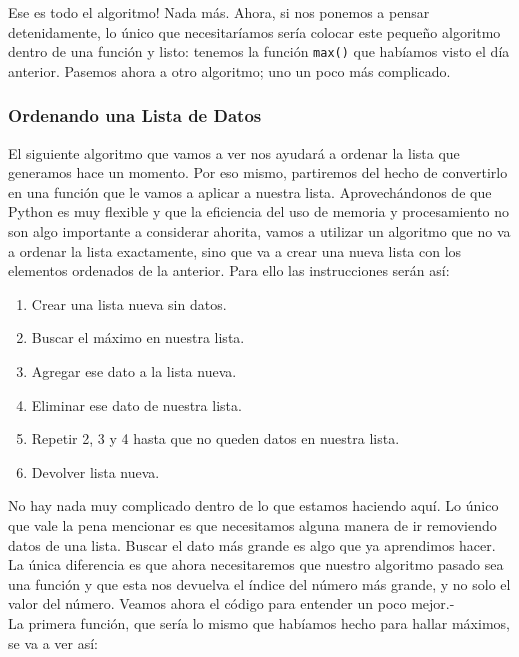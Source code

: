 \documentclass[10pt,letterpaper]{article}
\newcommand{\inlinecode}[1]{
\colorbox{light-gray}{\texttt{#1}}
}
\begin{document}
Ese es todo el algoritmo! Nada m\'as. Ahora, si nos ponemos a pensar detenidamente, lo \'unico que necesitar\'iamos ser\'ia colocar este peque\~no algoritmo dentro de una funci\'on y listo: tenemos la funci\'on \inlinecode{max()} que hab\'iamos visto el d\'ia anterior. Pasemos ahora a otro algoritmo; uno un poco m\'as complicado.

\subsubsection{Ordenando una Lista de Datos}
El siguiente algoritmo que vamos a ver nos ayudar\'a a ordenar la lista que generamos hace un momento. Por eso mismo, partiremos del hecho de convertirlo en una funci\'on que le vamos a aplicar a nuestra lista. Aprovech\'andonos de que Python es muy flexible y que la eficiencia del uso de memoria y procesamiento no son algo importante a considerar ahorita, vamos a utilizar un algoritmo que no va a ordenar la lista exactamente, sino que va a crear una nueva lista con los elementos ordenados de la anterior. Para ello las instrucciones ser\'an as\'i:

\begin{enumerate}
\item Crear una lista nueva sin datos.
\item Buscar el m\'aximo en nuestra lista.
\item Agregar ese dato a la lista nueva.
\item Eliminar ese dato de nuestra lista.
\item Repetir 2, 3 y 4 hasta que no queden datos en nuestra lista.
\item Devolver lista nueva.
\end{enumerate}

No hay nada muy complicado dentro de lo que estamos haciendo aqu\'i. Lo \'unico que vale la pena mencionar es que necesitamos alguna manera de ir removiendo datos de una lista. Buscar el dato m\'as grande es algo que ya aprendimos hacer. La \'unica diferencia es que ahora necesitaremos que nuestro algoritmo pasado sea una funci\'on y que esta nos devuelva el \'indice del n\'umero m\'as grande, y no solo el valor del n\'umero. Veamos ahora el c\'odigo para entender un poco mejor.-\\

La primera funci\'on, que ser\'ia lo mismo que hab\'iamos hecho para hallar m\'aximos, se va a ver as\'i:
\end{document}
